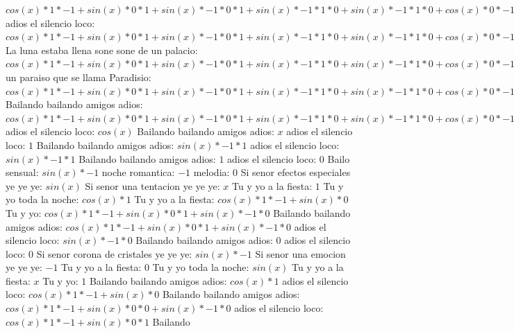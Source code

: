 \documentclass{article}
\begin{document}
${{{cos(x)*1*-1+sin(x)*0}*1+sin(x)*-1*0}*1+sin(x)*-1*1*0+sin(x)*-1*1*0+cos(x)*0}*-1+{sin(x)*-1*1*1+cos(x)*0}*0+{sin(x)*-1*1*1+cos(x)*0}*0+cos(x)*1*0$ adios el silencio loco: ${{{cos(x)*1*-1+sin(x)*0}*1+sin(x)*-1*0}*1+sin(x)*-1*1*0+sin(x)*-1*1*0+cos(x)*0}*-1+{sin(x)*-1*1*1+cos(x)*0}*0+{sin(x)*-1*1*1+cos(x)*0}*0+cos(x)*1*0+{sin(x)*-1*1*1+cos(x)*0}*0+cos(x)*1*0+cos(x)*1*0+sin(x)*0$ La luna estaba llena sone sone de un palacio: ${{{{cos(x)*1*-1+sin(x)*0}*1+sin(x)*-1*0}*1+sin(x)*-1*1*0+sin(x)*-1*1*0+cos(x)*0}*-1+{sin(x)*-1*1*1+cos(x)*0}*0+{sin(x)*-1*1*1+cos(x)*0}*0+cos(x)*1*0+{sin(x)*-1*1*1+cos(x)*0}*0+cos(x)*1*0+cos(x)*1*0+sin(x)*0}*1+{{sin(x)*-1*1*1+cos(x)*0}*-1+cos(x)*1*0+cos(x)*1*0+sin(x)*0}*0$ un paraiso que se llama Paradisio: ${{{{cos(x)*1*-1+sin(x)*0}*1+sin(x)*-1*0}*1+sin(x)*-1*1*0+sin(x)*-1*1*0+cos(x)*0}*-1+{sin(x)*-1*1*1+cos(x)*0}*0+{sin(x)*-1*1*1+cos(x)*0}*0+cos(x)*1*0+{sin(x)*-1*1*1+cos(x)*0}*0+cos(x)*1*0+cos(x)*1*0+sin(x)*0}*1+{{sin(x)*-1*1*1+cos(x)*0}*-1+cos(x)*1*0+cos(x)*1*0+sin(x)*0}*0+{{sin(x)*-1*1*1+cos(x)*0}*-1+cos(x)*1*0+cos(x)*1*0+sin(x)*0}*0+{cos(x)*1*-1+sin(x)*0}*0$ Bailando bailando amigos adios: ${{{{cos(x)*1*-1+sin(x)*0}*1+sin(x)*-1*0}*1+sin(x)*-1*1*0+sin(x)*-1*1*0+cos(x)*0}*-1+{sin(x)*-1*1*1+cos(x)*0}*0+{sin(x)*-1*1*1+cos(x)*0}*0+cos(x)*1*0+{sin(x)*-1*1*1+cos(x)*0}*0+cos(x)*1*0+cos(x)*1*0+sin(x)*0}*1+{{sin(x)*-1*1*1+cos(x)*0}*-1+cos(x)*1*0+cos(x)*1*0+sin(x)*0}*0+{{sin(x)*-1*1*1+cos(x)*0}*-1+cos(x)*1*0+cos(x)*1*0+sin(x)*0}*0+{cos(x)*1*-1+sin(x)*0}*0+{{sin(x)*-1*1*1+cos(x)*0}*-1+cos(x)*1*0+cos(x)*1*0+sin(x)*0}*0+{cos(x)*1*-1+sin(x)*0}*0+{cos(x)*1*-1+sin(x)*0}*0+sin(x)*-1*0$ adios el silencio loco: $cos(x)$  \newline Bailando bailando amigos adios: $x$ adios el silencio loco: $1$  \newline Bailando bailando amigos adios: $sin(x)*-1*1$ adios el silencio loco: $sin(x)*-1*1$ Bailando bailando amigos adios: $1$ adios el silencio loco: $0$  \newline Bailo sensual: $sin(x)*-1$ noche romantica: $-1$ melodia: $0$  \newline Si senor efectos especiales ye ye ye: $sin(x)$  \newline Si senor una tentacion ye ye ye: $x$ Tu y yo a la fiesta: $1$  \newline Tu y yo toda la noche: $cos(x)*1$ Tu y yo a la fiesta: $cos(x)*1*-1+sin(x)*0$ Tu y yo: ${cos(x)*1*-1+sin(x)*0}*1+sin(x)*-1*0$ Bailando bailando amigos adios: ${cos(x)*1*-1+sin(x)*0}*1+sin(x)*-1*0$  \newline adios el silencio loco: $sin(x)*-1*0$ Bailando bailando amigos adios: $0$ adios el silencio loco: $0$  \newline Si senor corona de cristales ye ye ye: $sin(x)*-1$ Si senor una emocion ye ye ye: $-1$ Tu y yo a la fiesta: $0$  \newline Tu y yo toda la noche: $sin(x)$  \newline Tu y yo a la fiesta: $x$ Tu y yo: $1$  \newline Bailando bailando amigos adios: $cos(x)*1$ adios el silencio loco: $cos(x)*1*-1+sin(x)*0$ Bailando bailando amigos adios: ${cos(x)*1*-1+sin(x)*0}*0+sin(x)*-1*0$ adios el silencio loco: ${cos(x)*1*-1+sin(x)*0}*1$ Bailando 
\end{document}
